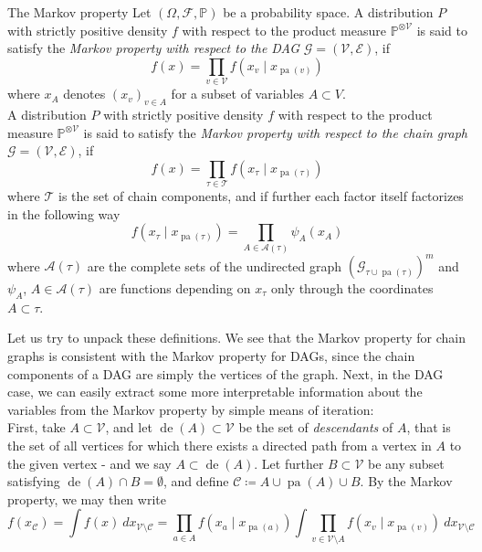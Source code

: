 \documentclass[11pt, a4paper]{memoir}
\theoremstyle{break}
\theoremstyle{break}
\theoremstyle{nonumberplain}
\newcommand{\mP}{\mathbb{P}}
\DeclareMathOperator{\pa}{pa}
\DeclareMathOperator{\de}{de}
\begin{document}
\begin{mydefinition}{The Markov property}
Let $(\Omega, \mathcal{F}, \mP)$ be a probability space. A distribution $P$ with strictly positive density $f$ with respect to the product measure $\mP^{\otimes \mathcal{V}}$ is said to satisfy the \emph{Markov property with respect to the DAG} $\mathcal{G}=(\mathcal{V}, \mathcal{E})$, if
\begin{equation}\label{MPDAG}
f(x)=\prod_{v\in \mathcal{V}}f\left(x_v\mid x_{\pa(v)}\right)
\end{equation}
where $x_A$ denotes $(x_v)_{v\in A}$ for a subset of variables $A\subset V$.\\[5pt]
A distribution $P$ with strictly positive density $f$ with respect to the product measure $\mP^{\otimes \mathcal{V}}$ is said to satisfy the \emph{Markov property with respect to the chain graph} $\mathcal{G}=(\mathcal{V}, \mathcal{E})$, if
\begin{equation}\label{MPCHAIN}
 f(x)=\prod_{\tau\in \mathscr{T}}f\left(x_\tau\mid x_{\pa(\tau)}\right)
\end{equation}
where $\mathscr{T}$ is the set of chain components, and if further each factor itself factorizes in the following way
$$f\left(x_\tau\mid x_{\pa(\tau)}\right)=\prod_{A\in \mathscr{A}(\tau)}\psi_A\left(x_A\right)$$
where $\mathscr{A}(\tau)$ are the complete sets of the undirected graph $\left(\mathcal{G}_{\tau\cup\pa(\tau)}\right)^m$ and $\psi_A$, $A\in \mathscr{A}(\tau)$ are functions depending on $x_\tau$ only through the coordinates $A\subset \tau$. 
\end{mydefinition}
Let us try to unpack these definitions. We see that the Markov property for chain graphs is consistent with the Markov property for DAGs, since the chain components of a DAG are simply the vertices of the graph. Next, in the DAG case, we can easily extract some more interpretable information about the variables from the Markov property by simple means of iteration:\\[5pt]
First, take $A\subset \mathcal{V}$, and let $\de(A)\subset \mathcal{V}$ be the set of \emph{descendants} of $A$, that is the set of all vertices for which there exists a directed path from a vertex in $A$ to the given vertex - and we say $A\subset \de(A)$. Let further $B\subset \mathcal{V}$ be any subset satisfying $\de(A)\cap B=\emptyset$, and define $\mathcal{C}\coloneqq A\cup\pa(A)\cup B$. By the Markov property, we may then write
$$f\left(x_{\mathcal{C}}\right)=\int f(x)\ dx_{\mathcal{V}\setminus \mathcal{C}}=\prod_{a\in A}f\left(x_{a}\mid x_{\pa(a)}\right)\int \prod_{v\in \mathcal{V}\setminus A} f\left(x_v\mid x_{\pa(v)}\right)\ dx_{\mathcal{V}\setminus \mathcal{C}}$$
\end{document}
